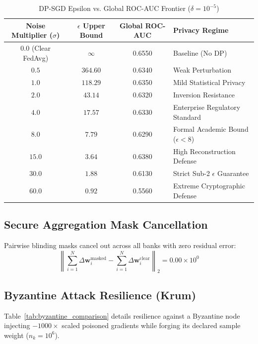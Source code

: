 \documentclass[conference]{IEEEtran}
\begin{document}
\begin{table}[htbp]
\centering
\caption{DP-SGD Epsilon vs. Global ROC-AUC Frontier ($\delta=10^{-5}$)}
\label{tab:dp_sweep}
\small
\begin{tabular}{cccl}
\toprule
\textbf{Noise Multiplier ($\sigma$)} & \textbf{$\epsilon$ Upper Bound} & \textbf{Global ROC-AUC} & \textbf{Privacy Regime} \\
\midrule
$0.0$ (Clear FedAvg) & $\infty$  & 0.6550 & Baseline (No DP) \\
$0.5$                & $364.60$  & 0.6340 & Weak Perturbation \\
$1.0$                & $118.29$  & 0.6350 & Mild Statistical Privacy \\
$2.0$                & $43.14$   & 0.6320 & Inversion Resistance \\
$4.0$                & $17.57$   & 0.6330 & Enterprise Regulatory Standard \\
$8.0$                & $7.79$    & 0.6290 & Formal Academic Bound ($\epsilon < 8$) \\
$15.0$               & $3.64$    & 0.6380 & High Reconstruction Defense \\
$30.0$               & $1.88$    & 0.6130 & Strict Sub-2 $\epsilon$ Guarantee \\
$60.0$               & $0.92$    & 0.5560 & Extreme Cryptographic Defense \\
\bottomrule
\end{tabular}
\end{table}

\subsection{Secure Aggregation Mask Cancellation}
Pairwise blinding masks cancel out across all banks with zero residual error:
\begin{equation}
\left\| \sum_{i=1}^N \Delta \mathbf{w}_i^{\text{masked}} - \sum_{i=1}^N \Delta \mathbf{w}_i^{\text{clear}} \right\|_2 = 0.00 \times 10^0
\end{equation}

\subsection{Byzantine Attack Resilience (Krum)}
Table~\ref{tab:byzantine_comparison} details resilience against a Byzantine node injecting $-1000\times$ scaled poisoned gradients while forging its declared sample weight ($n_k = 10^6$).
\end{document}
